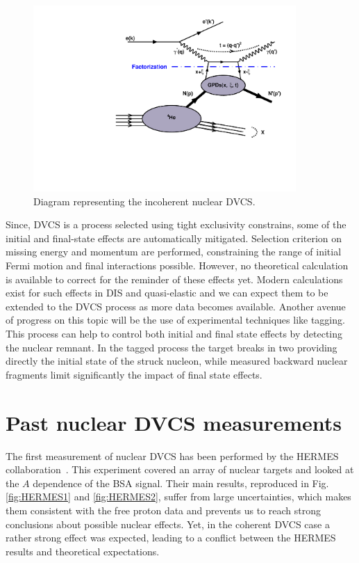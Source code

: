 \documentclass{article}
\begin{document}
\begin{figure}[tbp!]
\center
\includegraphics[width=10cm]{fig3/handbag_incoherent.pdf}
\caption{Diagram representing the incoherent nuclear DVCS.}
\label{fig:InCohDiag}
\end{figure}

Since, DVCS is a 
process selected using tight exclusivity constrains, some of the initial and final-state effects are
automatically mitigated. Selection criterion on missing energy and momentum are performed,
constraining the range of initial Fermi motion and final interactions possible. However, no theoretical
calculation is available to correct for the reminder of these effects yet. Modern calculations exist 
for such effects in DIS \cite{Cosyn:2017ekf} and quasi-elastic \cite{Ethier:2014bua}
and we can expect them to be extended to the DVCS 
process as more data becomes available. Another avenue of progress
on this topic will be the use of experimental techniques like tagging. This process
can help to control both initial and final state effects by detecting the nuclear remnant.
In the tagged process the target breaks in two providing directly the initial state
of the struck nucleon, while measured backward nuclear fragments limit significantly the
impact of final state effects.

\section{Past nuclear DVCS measurements}

The first measurement of nuclear DVCS has been performed by the HERMES 
collaboration~\cite{Airapetian:2009cga}. This experiment covered an array of 
nuclear targets and looked at the $A$ dependence of the
BSA signal. Their main results, reproduced in Fig. \ref{fig:HERMES1} and \ref{fig:HERMES2}, suffer
from large uncertainties, which makes them consistent with the free proton data and prevents us to
reach strong conclusions about possible nuclear effects. Yet, in the coherent DVCS case a rather
strong effect was expected, leading to a conflict between the HERMES results and theoretical
expectations. 
\end{document}
